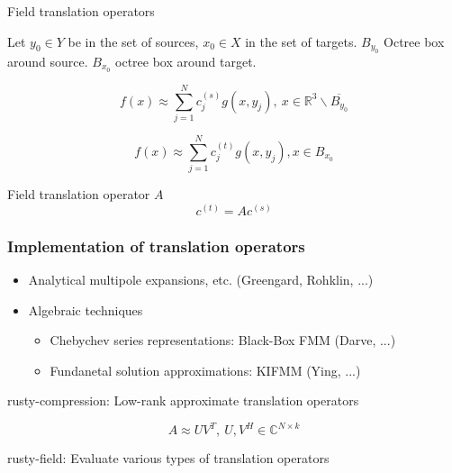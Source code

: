 \documentclass[dvipsnames,10pt]{beamer}
\begin{document}
\begin{frame}{Field translation operators}
	
	Let $y_0\in Y$ be in the set of sources, $x_0\in X$ in the set of targets.
	$B_{y_0}$ Octree box around source. $B_{x_0}$ octree box around target.
	
	\vspace{\baselineskip}
	
	{}
	$$
	f(x) \approx \sum_{j=1}^N c_j^{(s)}g(x, y_j),~x\in\mathbb{R}^3\backslash \overline{B_{y_0}}
	$$
	
	\vspace{\baselineskip}
	
	{}
	$$
	f(x) \approx \sum_{j=1}^N c_j^{(t)}g(x, y_j), x\in B_{x_0}
	$$
	
	\vspace{-.5cm}
	
	\begin{tcolorbox}
		Field translation operator $A$
		$$
		c^{(t)} = Ac^{(s)}
		$$
	\end{tcolorbox}
	
		
\end{frame}

\begin{frame}\frametitle{Implementation of translation operators}
	
	\begin{itemize}
		\item Analytical multipole expansions, etc. (Greengard, Rohklin, ...)
		\item Algebraic techniques
		\begin{itemize}
			\item Chebychev series representations: Black-Box FMM (Darve, ...)
			\item Fundanetal solution approximations: KIFMM (Ying, ...)
		\end{itemize}
	\end{itemize}

	\vspace{1cm}

	{\color{blue} rusty-compression:} Low-rank approximate translation operators
	
	$$
	A\approx UV^T,~U, V^H\in\mathbb{C}^{N\times k}
	$$
	
	{\color{blue}rusty-field:} Evaluate various types of translation operators
	
	
\end{frame}
	
\end{document}
